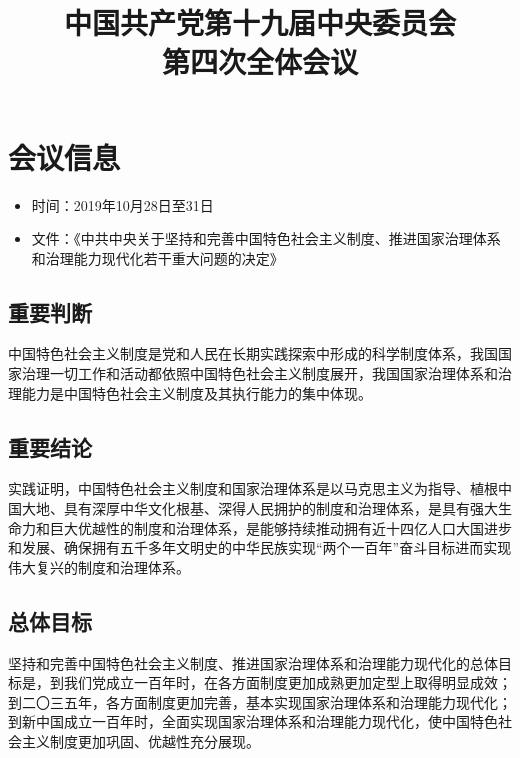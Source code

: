 \documentclass[a4paper, UTF8]{ctexart}
\title{\huge{\heiti 中国共产党第十九届中央委员会\protect\\第四次全体会议\protect}}
\author{}
\date{}
\begin{document}
\maketitle

\section{会议信息}
    \begin{itemize}
        \item 时间：2019年10月28日至31日
        \item 文件：《中共中央关于坚持和完善中国特色社会主义制度、推进国家治理体系和治理能力现代化若干重大问题的决定》
    \end{itemize}
    
\subsection{重要判断}
    中国特色社会主义制度是党和人民在长期实践探索中形成的科学制度体系，我国国家治理一切工作和活动都依照中国特色社会主义制度展开，我国国家治理体系和治理能力是中国特色社会主义制度及其执行能力的集中体现。

\subsection{重要结论}
    实践证明，中国特色社会主义制度和国家治理体系是以马克思主义为指导、植根中国大地、具有深厚中华文化根基、深得人民拥护的制度和治理体系，是具有强大生命力和巨大优越性的制度和治理体系，是能够持续推动拥有近十四亿人口大国进步和发展、确保拥有五千多年文明史的中华民族实现“两个一百年”奋斗目标进而实现伟大复兴的制度和治理体系。

\subsection{总体目标}
    坚持和完善中国特色社会主义制度、推进国家治理体系和治理能力现代化的总体目标是，到我们党成立一百年时，在各方面制度更加成熟更加定型上取得明显成效；到二〇三五年，各方面制度更加完善，基本实现国家治理体系和治理能力现代化；到新中国成立一百年时，全面实现国家治理体系和治理能力现代化，使中国特色社会主义制度更加巩固、优越性充分展现。
\end{document}
